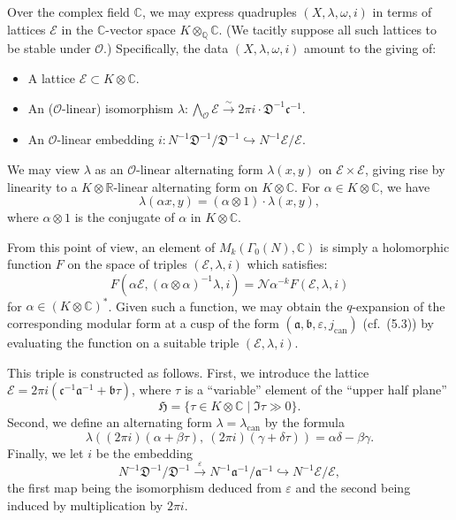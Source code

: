 \documentclass[12pt,a4paper]{article}
\theoremstyle{plain}
\theoremstyle{definition}
\theoremstyle{remark}
\begin{document}
Over the complex field $\mathbb{C}$, we may express quadruples $(X, \lambda, \omega, i)$ in terms of lattices $\mathcal{E}$ in the $\mathbb{C}$-vector space $K \otimes_{\mathbb{Q}} \mathbb{C}$. (We tacitly suppose all such lattices to be stable under $\mathcal{O}$.) Specifically, the data $(X, \lambda, \omega, i)$ amount to the giving of:
\begin{itemize}
\item A lattice $\mathcal{E} \subset K \otimes \mathbb{C}$.
\item An ($\mathcal{O}$-linear) isomorphism $\lambda: \bigwedge_{\mathcal{O}} \mathcal{E} \xrightarrow{\sim} 2\pi i \cdot \mathfrak{D}^{-1}\mathfrak{c}^{-1}$.
\item An $\mathcal{O}$-linear embedding $i: N^{-1}\mathfrak{D}^{-1}/\mathfrak{D}^{-1} \hookrightarrow N^{-1}\mathcal{E}/\mathcal{E}$.
\end{itemize}
We may view $\lambda$ as an $\mathcal{O}$-linear alternating form $\lambda(x, y)$ on $\mathcal{E} \times \mathcal{E}$, giving rise by linearity to a $K \otimes \mathbb{R}$-linear alternating form on $K \otimes \mathbb{C}$. For $\alpha \in K \otimes \mathbb{C}$, we have
\[
\lambda(\alpha x, y) = (\alpha \otimes 1) \cdot \lambda(x, y),
\]
where $\alpha \otimes 1$ is the conjugate of $\alpha$ in $K \otimes \mathbb{C}$.

From this point of view, an element of $M_k(\Gamma_0(N), \mathbb{C})$ is simply a holomorphic function $F$ on the space of triples $(\mathcal{E}, \lambda, i)$ which satisfies:
\begin{equation}\label{eq:5.6}
F(\alpha\mathcal{E}, (\alpha \otimes \alpha)^{-1}\lambda, i) = \mathcal{N}\alpha^{-k} F(\mathcal{E}, \lambda, i)
\end{equation}
for $\alpha \in (K \otimes \mathbb{C})^*$. Given such a function, we may obtain the $q$-expansion of the corresponding modular form at a cusp of the form $(\mathfrak{a}, \mathfrak{b}, \varepsilon, j_{\mathrm{can}})$ (cf.~(5.3)) by evaluating the function on a suitable triple $(\mathcal{E}, \lambda, i)$.

This triple is constructed as follows. First, we introduce the lattice $\mathcal{E} = 2\pi i(\mathfrak{c}^{-1}\mathfrak{a}^{-1} + \mathfrak{b}\tau)$, where $\tau$ is a ``variable'' element of the ``upper half plane''
\[
\mathfrak{H} = \{\tau \in K \otimes \mathbb{C} \mid \Im\tau \gg 0\}.
\]
Second, we define an alternating form $\lambda = \lambda_{\mathrm{can}}$ by the formula
\[
\lambda((2\pi i)(\alpha + \beta\tau),\ (2\pi i)(\gamma + \delta\tau)) = \alpha\delta - \beta\gamma.
\]
Finally, we let $i$ be the embedding
\[
N^{-1}\mathfrak{D}^{-1}/\mathfrak{D}^{-1} \xrightarrow{\varepsilon} N^{-1}\mathfrak{a}^{-1}/\mathfrak{a}^{-1} \hookrightarrow N^{-1}\mathcal{E}/\mathcal{E},
\]
the first map being the isomorphism deduced from $\varepsilon$ and the second being induced by multiplication by $2\pi i$.
\end{document}
